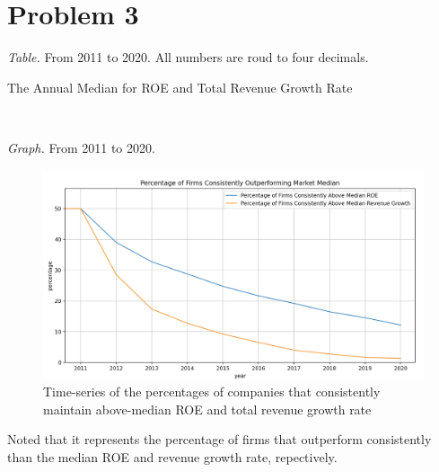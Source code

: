 
\section*{Problem 3}

\textit{Table.} From 2011 to 2020. All numbers are roud to four decimals.


\begin{table}[htbp]
    \centering
    \caption{The Annual Median for ROE and Total Revenue Growth Rate}
    \vspace{0.4cm}
\end{table}

\ 


\textit{Graph.} From 2011 to 2020.

\begin{figure}[h]
\centering
\includegraphics[width=1\textwidth]{data/pct_consistent_outperformer.png}
\caption{Time-series of the percentages of companies that consistently maintain above-median ROE and total revenue growth rate}
\label{fig:example}
\end{figure}

Noted that it represents the percentage of firms that outperform consistently than the median ROE and revenue growth rate, repectively.
